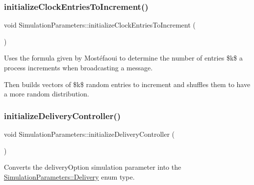\mbox{\label{class_simulation_parameters_aeef091d6ca357795fa7ff6b3661fb2fd}} 
\subsubsection{\texorpdfstring{initialize\+Clock\+Entries\+To\+Increment()}{initializeClockEntriesToIncrement()}}
{\footnotesize\ttfamily void Simulation\+Parameters\+::initialize\+Clock\+Entries\+To\+Increment (\begin{DoxyParamCaption}{ }\end{DoxyParamCaption})\hspace{0.3cm}{\ttfamily [protected]}}



Uses the formula given by Mostéfaoui to determine the number of entries \$k\$ a process increments when broadcasting a message. 

Then builds vectors of \$k\$ random entries to increment and shuffles them to have a more random distribution. \mbox{\label{class_simulation_parameters_afec1fdd41805feba54ad575a4542aab1}} 
\subsubsection{\texorpdfstring{initialize\+Delivery\+Controller()}{initializeDeliveryController()}}
{\footnotesize\ttfamily void Simulation\+Parameters\+::initialize\+Delivery\+Controller (\begin{DoxyParamCaption}{ }\end{DoxyParamCaption})\hspace{0.3cm}{\ttfamily [protected]}}



Converts the delivery\+Option simulation parameter into the \hyperlink{class_simulation_parameters_ae08444273809241f502aa422205f7307}{Simulation\+Parameters\+::\+Delivery} enum type. 



